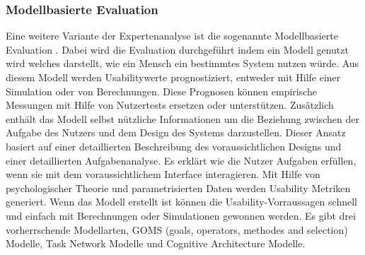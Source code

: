 \documentclass[draft=false
              ,paper=a4
              ,twoside=false
              ,fontsize=11pt
              ,headsepline
              ,BCOR10mm
              ,DIV11
              ]{scrbook}
\begin{document}
\subsubsection{Modellbasierte Evaluation} %
\label{ssub:modellbasierte_evaluation}
Eine weitere Variante der Expertenanalyse ist die sogenannte Modellbasierte Evaluation \cite{kieras_human-computer_2003}. Dabei wird die Evaluation durchgeführt indem ein Modell genutzt wird welches darstellt, wie ein Mensch ein bestimmtes System nutzen würde. Aus diesem Modell werden Usabilitywerte prognostiziert, entweder mit Hilfe einer Simulation oder von Berechnungen. Diese Prognosen können empirische Messungen mit Hilfe von Nutzertests ersetzen oder unterstützen. Zusätzlich enthält das Modell selbst nützliche Informationen um die Beziehung zwischen der Aufgabe des Nutzers und dem Design des Systems darzustellen.
Dieser Ansatz basiert auf einer detaillierten Beschreibung des voraussichtlichen Designs und einer detaillierten Aufgabenanalyse. Es erklärt wie die Nutzer Aufgaben erfüllen, wenn sie mit dem voraussichtlichem Interface interagieren. Mit Hilfe von psychologischer Theorie und parametrisierten Daten werden Usability Metriken generiert. Wenn das Modell erstellt ist können die Usability-Vorraussagen schnell und einfach mit Berechnungen oder Simulationen gewonnen werden.
Es gibt drei vorherrschende Modellarten, GOMS (goals, operators, methodes and selection) Modelle, Task Network Modelle und Cognitive Architecture Modelle.
\end{document}
